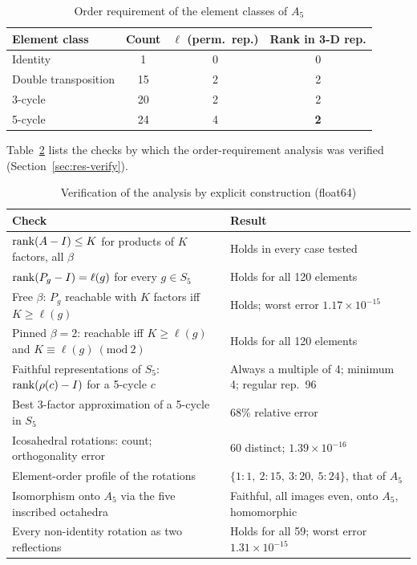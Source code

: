 \begin{table}[ht]
	\caption{Order requirement of the element classes of $A_5$}
	\centering
	\begin{tabular}{l c c c}
		\toprule
		\textbf{Element class} & \textbf{Count} & \textbf{$\ell$ (perm.\ rep.)} & \textbf{Rank in 3-D rep.} \\
		\midrule
		Identity             & 1  & 0 & 0 \\
		Double transposition & 15 & 2 & 2 \\
		3-cycle              & 20 & 2 & 2 \\
		5-cycle              & 24 & 4 & \textbf{2} \\
		\bottomrule
	\end{tabular}
	\label{tab:a5classes}
\end{table}

Table~\ref{tab:verify} lists the checks by which the order-requirement analysis was verified (Section~\ref{sec:res-verify}).

\begin{table}[ht]
	\caption{Verification of the analysis by explicit construction (float64)}
	\centering
	\small
	\begin{tabular}{p{7.4cm} p{5.2cm}}
		\toprule
		\textbf{Check} & \textbf{Result} \\
		\midrule
		$\operatorname{rank}(A - I) \le K$ for products of $K$ factors, all $\beta$ & Holds in every case tested \\
		$\operatorname{rank}(P_g - I) = \ell(g)$ for every $g \in S_5$ & Holds for all 120 elements \\
		Free $\beta$: $P_g$ reachable with $K$ factors iff $K \ge \ell(g)$ & Holds; worst error $1.17\times10^{-15}$ \\
		Pinned $\beta = 2$: reachable iff $K \ge \ell(g)$ and $K \equiv \ell(g)\ (\mathrm{mod}\ 2)$ & Holds for all 120 elements \\
		Faithful representations of $S_5$: $\operatorname{rank}(\rho(c)-I)$ for a 5-cycle $c$ & Always a multiple of 4; minimum 4; regular rep.\ 96 \\
		Best 3-factor approximation of a 5-cycle in $S_5$ & 68\% relative error \\
		Icosahedral rotations: count; orthogonality error & 60 distinct; $1.39\times10^{-16}$ \\
		Element-order profile of the rotations & $\{1{:}1,\ 2{:}15,\ 3{:}20,\ 5{:}24\}$, that of $A_5$ \\
		Isomorphism onto $A_5$ via the five inscribed octahedra & Faithful, all images even, onto $A_5$, homomorphic \\
		Every non-identity rotation as two reflections & Holds for all 59; worst error $1.31\times10^{-15}$ \\
		\bottomrule
	\end{tabular}
	\label{tab:verify}
\end{table}

